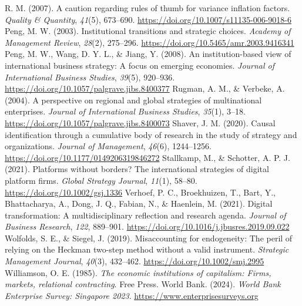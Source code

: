 \documentclass[12pt,a4paper]{article}
\begin{document}
R. M. (2007). A caution regarding rules of thumb for variance inflation
factors. \emph{Quality \& Quantity}, \emph{41}(5), 673--690.
\url{https://doi.org/10.1007/s11135-006-9018-6} Peng, M. W. (2003).
Institutional transitions and strategic choices. \emph{Academy of
Management Review}, \emph{28}(2), 275--296.
\url{https://doi.org/10.5465/amr.2003.9416341} Peng, M. W., Wang, D. Y.
L., \& Jiang, Y. (2008). An institution-based view of international
business strategy: A focus on emerging economies. \emph{Journal of
International Business Studies}, \emph{39}(5), 920--936.
\url{https://doi.org/10.1057/palgrave.jibs.8400377} Rugman, A. M., \&
Verbeke, A. (2004). A perspective on regional and global strategies of
multinational enterprises. \emph{Journal of International Business
Studies}, \emph{35}(1), 3--18.
\url{https://doi.org/10.1057/palgrave.jibs.8400073} Shaver, J. M.
(2020). Causal identification through a cumulative body of research in
the study of strategy and organizations. \emph{Journal of Management},
\emph{46}(6), 1244--1256. \url{https://doi.org/10.1177/0149206319846272}
Stallkamp, M., \& Schotter, A. P. J. (2021). Platforms without borders?
The international strategies of digital platform firms. \emph{Global
Strategy Journal}, \emph{11}(1), 58--80.
\url{https://doi.org/10.1002/gsj.1336} Verhoef, P. C., Broekhuizen, T.,
Bart, Y., Bhattacharya, A., Dong, J. Q., Fabian, N., \& Haenlein, M.
(2021). Digital transformation: A multidisciplinary reflection and
research agenda. \emph{Journal of Business Research}, \emph{122},
889--901. \url{https://doi.org/10.1016/j.jbusres.2019.09.022} Wolfolds,
S. E., \& Siegel, J. (2019). Misaccounting for endogeneity: The peril of
relying on the Heckman two-step method without a valid instrument.
\emph{Strategic Management Journal}, \emph{40}(3), 432--462.
\url{https://doi.org/10.1002/smj.2995} Williamson, O. E. (1985).
\emph{The economic institutions of capitalism: Firms, markets,
relational contracting}. Free Press. World Bank. (2024). \emph{World
Bank Enterprise Survey: Singapore 2023}.
\url{https://www.enterprisesurveys.org}
\end{document}
